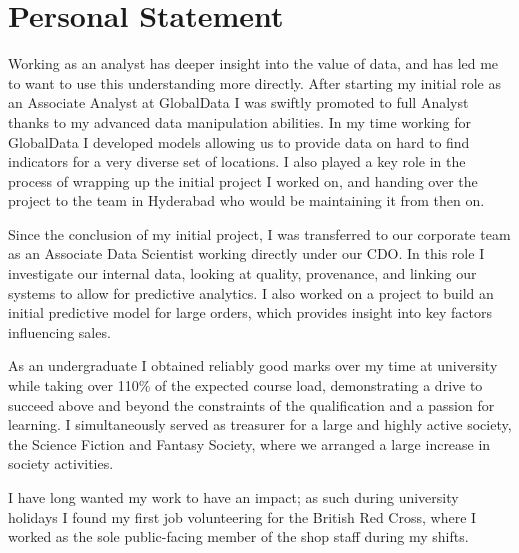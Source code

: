 \documentclass[print, oneside]{friggeri-cv} %
\begin{document}
\section{Personal Statement}
\begin{entrylist}
\entry{}{}{}
{

\quad Working as an analyst has deeper insight into the value of data, and has led me to want to use this understanding more directly.
After starting my initial role as an Associate Analyst at GlobalData I was swiftly promoted to full Analyst thanks to my advanced data manipulation abilities.
In my time working for GlobalData I developed models allowing us to provide data on hard to find indicators for a very diverse set of locations.
I also played a key role in the process of wrapping up the initial project I worked on, and handing over the project to the team in Hyderabad who would be maintaining it from then on.

Since the conclusion of my initial project, I was transferred to our corporate team as an Associate Data Scientist working directly under our CDO.
In this role I investigate our internal data, looking at quality, provenance, and linking our systems to allow for predictive analytics.
I also worked on a project to build an initial predictive model for large orders, which provides insight into key factors influencing sales.

\quad As an undergraduate I obtained reliably good marks over my time at university while taking over 110\% of the expected course load, demonstrating a drive to succeed above and beyond the constraints of the qualification and a passion for learning.
I simultaneously served as treasurer for a large and highly active society, the Science Fiction and Fantasy Society, where we arranged a large increase in society activities.

\quad I have long wanted my work to have an impact; as such during university holidays I found  my first job volunteering for the British Red Cross, where I worked as the sole public-facing member of the shop staff during my shifts.

}
\end{entrylist}
\end{document}
